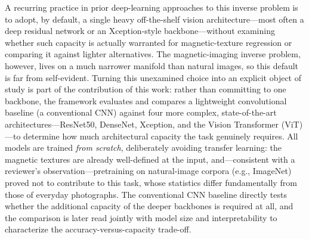 \documentclass[letterpaper, 12, one column]{article}
\begin{document}
A recurring practice in prior deep-learning approaches to this inverse problem is to adopt, by default, a single heavy off-the-shelf vision architecture---most often a deep residual network or an Xception-style backbone---without examining whether such capacity is actually warranted for magnetic-texture regression or comparing it against lighter alternatives. The magnetic-imaging inverse problem, however, lives on a much narrower manifold than natural images, so this default is far from self-evident. Turning this unexamined choice into an explicit object of study is part of the contribution of this work: rather than committing to one backbone, the framework evaluates and compares a lightweight convolutional baseline (a conventional CNN) against four more complex, state-of-the-art architectures---ResNet50, DenseNet, Xception, and the Vision Transformer (ViT)---to determine how much architectural capacity the task genuinely requires. All models are trained \emph{from scratch}, deliberately avoiding transfer learning: the magnetic textures are already well-defined at the input, and---consistent with a reviewer's observation---pretraining on natural-image corpora (e.g., ImageNet) proved not to contribute to this task, whose statistics differ fundamentally from those of everyday photographs. The conventional CNN baseline directly tests whether the additional capacity of the deeper backbones is required at all, and the comparison is later read jointly with model size and interpretability to characterize the accuracy-versus-capacity trade-off.
\end{document}
